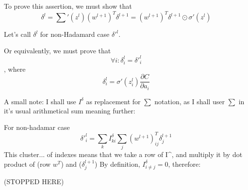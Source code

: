 \documentclass{article}
\begin{document}
To prove this assertion, we must show that 
$$\delta^l = {\sum}'(z^l) (w^{l+1})^{T} \delta^{l+1} = (w^{l+1})^{T} \delta^{l+1}\odot\sigma'(z^l)$$

Let's call $\delta^l$ for non-Hadamard case $\delta'^l$.

Or equivalently, we must prove that $$\forall i: \delta^l_i = \delta'^l_i$$,
where $$\delta^l_i = \sigma'(z_i^l)\frac{\partial C}{\partial a_i}$$

A small note: I shall use $I^{\delta}$ as replacement for $\sum$ notation, as I shall user $\sum$ in it's usual arithmetical sum meaning further:

For non-hadamar case
$$\delta'^l_i = \sum_k I^{\delta}_{ki} \sum_j(w^{l+1})^T_{ij} \delta^{l+1}_j$$
This cluster... of indexes means that we take a row of I^{\delta}, and multiply it by dot product of (row  $w^T$) and ($\delta^{l+1}_j$)
By definition, $I^{\delta}_{i \neq j} = 0$, therefore:



(STOPPED HERE)
\end{document}
